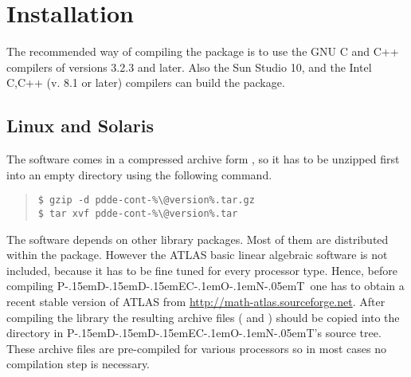\documentclass[10pt,a4paper]{ddedoc}
\def\pdde{{P\kern-.15emD\kern-.15emD\kern-.15emE\raisebox{.25ex}{-}C\kern-.1emO\kern-.1emN\kern-.05emT}}
\begin{document}
\section{Installation}

The recommended way of compiling the package is to use the GNU C and C++ compilers of versions 3.2.3 and later. Also the Sun Studio 10, and the Intel C,C++ (v. 8.1 or later) compilers can build the package.

\subsection{Linux and Solaris}

The software comes in a compressed archive form , so it has to be unzipped first into an empty directory using the following command.
{ \small \begin{quote} \begin{lstlisting}[basicstyle=\ttfamily,frame=single]
$ gzip -d pdde-cont-%\@version%.tar.gz
$ tar xvf pdde-cont-%\@version%.tar
\end{lstlisting} \end{quote} } \noindent
The software depends on other library packages. Most of them are distributed within the package. However the ATLAS basic linear algebraic software is not included, because it has to be fine tuned for every processor type. Hence, before compiling \pdde\ one has to obtain a recent stable version of ATLAS from \url{http://math-atlas.sourceforge.net}. After compiling the library the resulting archive files ( and ) should be copied into the  directory in \pdde 's source tree. These archive files are pre-compiled for various processors so in most cases no compilation step is necessary.
\end{document}
